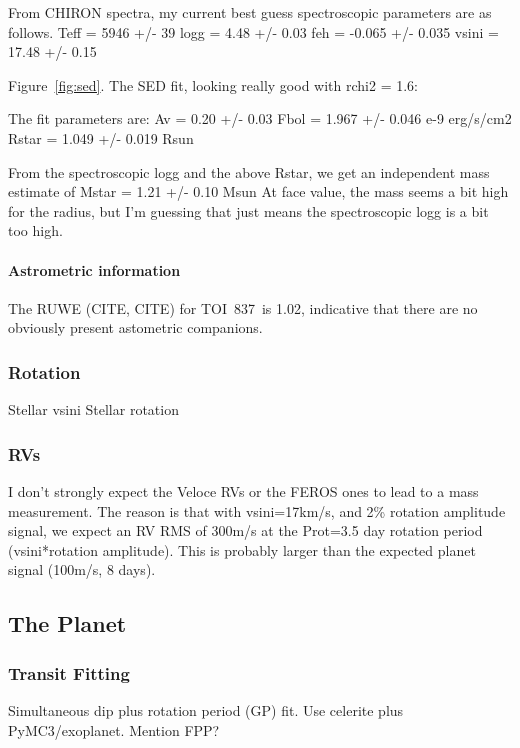 \documentclass[12pt,twocolumn,tighten]{aastex62}
\newcommand{\tn}{TOI~837} %
\begin{document}
From CHIRON spectra, my current best guess spectroscopic parameters
 are as follows.
 Teff = 5946 +/- 39
 logg = 4.48 +/- 0.03
 feh = -0.065 +/- 0.035
 vsini = 17.48 +/- 0.15

Figure~\ref{fig:sed}.
The SED fit, looking really good with rchi2 = 1.6: 

The fit parameters are: 
Av = 0.20 +/- 0.03
Fbol = 1.967 +/- 0.046 e-9 erg/s/cm2 
Rstar = 1.049 +/- 0.019 Rsun 

From the spectroscopic logg and the above Rstar, we get an independent
mass estimate of 
Mstar = 1.21 +/- 0.10 Msun 
At face value, the mass seems a bit high for the radius, but I'm
guessing that just means the spectroscopic logg is a bit too high. 


\paragraph{Astrometric information}
The RUWE (CITE, CITE) for \tn\ is 1.02, indicative that there are no
obviously present astometric companions.


\subsubsection{Rotation}
Stellar vsini
Stellar rotation

\subsubsection{RVs}
I don't strongly expect the Veloce RVs or the FEROS ones to lead to a
mass measurement. The reason is that with vsini=17km/s, and 2\%
rotation amplitude signal, we expect an RV RMS of 300m/s at the
Prot=3.5 day rotation period (vsini*rotation amplitude). This is
probably larger than the expected planet signal (100m/s, 8 days).




\subsection{The Planet}
\label{subsec:planet}

\subsubsection{Transit Fitting}
Simultaneous dip plus rotation period (GP) fit. Use celerite plus PyMC3/exoplanet.
Mention FPP?

\end{document}
